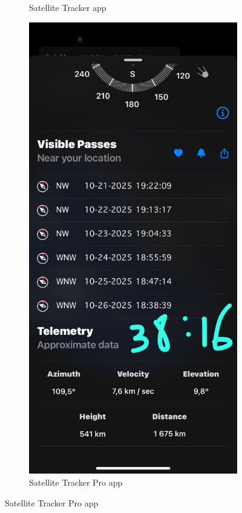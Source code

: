 \documentclass{article}
\begin{document}
\begin{figure}[h!]
\begin{subfigure}[b]{0.35\textwidth}
        \caption{Satellite Tracker app}
        \label{fig:tracker_screenshot}
    \end{subfigure}
    \begin{subfigure}[b]{0.35\textwidth}
        \centering
        \includegraphics[width=\textwidth]{LaTeX/Figures/Satellite_Tracker_Pro_Screenshot.jpg}
        \caption{Satellite Tracker Pro app}
        \label{fig:tracker_pro_screenshot}
    \end{subfigure}
    
\end{figure}
\end{document}
